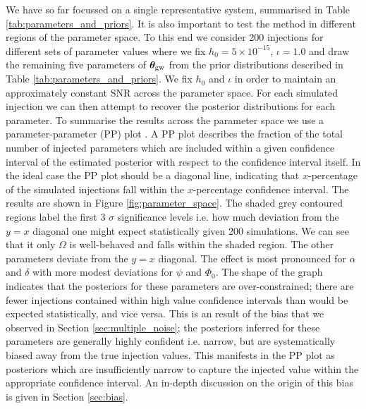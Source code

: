 \documentclass[fleqn,usenatbib,useAMS]{mnras}
\begin{document}
We have so far focussed on a single representative system, summarised in Table \ref{tab:parameters_and_priors}. It is also important to test the method in different regions of the parameter space. To this end we consider 200 injections for different sets of parameter values where we fix $h_0 = 5 \times 10^{-15}$, $\iota =1.0$ and draw the remaining five parameters of $\boldsymbol{\theta}_{\rm gw}$ from the prior distributions described in Table \ref{tab:parameters_and_priors}. We fix $h_0$ and $\iota$ in order to maintain an approximately constant SNR across the parameter space. For each simulated injection we can then attempt to recover the posterior distributions for each parameter. To summarise the results across the parameter space we use a parameter-parameter (PP) plot \citep{doi:10.1198/106186006X136976}. A PP plot describes the fraction of the total number of injected parameters which are included within a given confidence interval of the estimated posterior with respect to the confidence interval itself. In the ideal case the PP plot should be a diagonal line, indicating that $x$-percentage of the simulated injections fall within the $x$-percentage confidence interval. The results are shown in Figure \ref{fig:parameter_space}. The shaded grey contoured regions label the first 3 $\sigma$ significance levels i.e. how much deviation from the $y=x$ diagonal one might expect statistically given 200 simulations.  We can see that it only $\Omega$ is well-behaved and falls within the shaded region. The other parameters deviate from the $y=x$ diagonal. The effect is most pronounced for $\alpha$ and $\delta$ with more modest deviations for $\psi$ and $\Phi_0$. The shape of the graph indicates that the posteriors for these parameters are over-constrained; there are fewer injections contained within high value confidence intervals than would be expected statistically, and vice versa. This is an result of the bias that we observed in Section \ref{sec:multiple_noise}; the posteriors inferred for these parameters are generally highly confident i.e. narrow, but are systematically biased away from the true injection values. This manifests in the PP plot as posteriors which are insufficiently narrow to capture the injected value within the appropriate confidence interval. An in-depth discussion on the origin of this bias is given in Section \ref{sec:bias}. 
\end{document}

